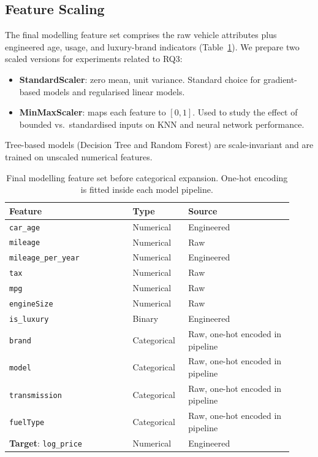\subsection{Feature Scaling}
\label{sec:scaling}

The final modelling feature set comprises the raw vehicle attributes plus engineered age, usage, and luxury-brand indicators (Table~\ref{tab:features}).
We prepare two scaled versions for experiments related to RQ3:
\begin{itemize}
  \item \textbf{StandardScaler}: zero mean, unit variance. Standard choice for gradient-based models and regularised linear models.
  \item \textbf{MinMaxScaler}: maps each feature to $[0, 1]$. Used to study the effect of bounded vs.\ standardised inputs on KNN and neural network performance.
\end{itemize}
Tree-based models (Decision Tree and Random Forest) are scale-invariant and are trained on unscaled numerical features.

\begin{table}[h]
\centering
\begingroup
\setlength{\tabcolsep}{3pt}
\scriptsize
\begin{tabular}{@{}p{0.40\linewidth}p{0.18\linewidth}p{0.34\linewidth}@{}}
\toprule
\textbf{Feature} & \textbf{Type} & \textbf{Source} \\
\midrule
\texttt{car\_age}          & Numerical  & Engineered \\
\texttt{mileage}           & Numerical  & Raw \\
\texttt{mileage\_per\_year}& Numerical  & Engineered \\
\texttt{tax}               & Numerical  & Raw \\
\texttt{mpg}               & Numerical  & Raw \\
\texttt{engineSize}        & Numerical  & Raw \\
\texttt{is\_luxury}        & Binary     & Engineered \\
\texttt{brand}             & Categorical & Raw, one-hot encoded in pipeline \\
\texttt{model}             & Categorical & Raw, one-hot encoded in pipeline \\
\texttt{transmission}      & Categorical & Raw, one-hot encoded in pipeline \\
\texttt{fuelType}          & Categorical & Raw, one-hot encoded in pipeline \\
\midrule
\textbf{Target}: \texttt{log\_price} & Numerical & Engineered \\
\bottomrule
\end{tabular}
\endgroup
\caption{Final modelling feature set before categorical expansion. One-hot encoding is fitted inside each model pipeline.}
\label{tab:features}
\end{table}

